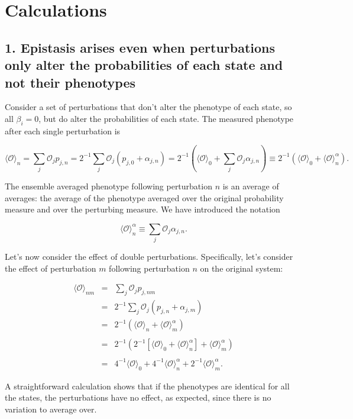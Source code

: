 \documentclass[12pt]{article}
\def\be{\begin{equation}}
\def\ee{\end{equation}}
\def\bea{\begin{eqnarray}}
\def\eea{\end{eqnarray}}
\def\O{\mathcal{O}}
\begin{document}
\section*{Calculations}

\subsection*{1. Epistasis arises even when perturbations only alter the probabilities of each state and not their phenotypes}

Consider a set of perturbations that don't alter the phenotype of each state, so all $\beta_i=0$, but do alter the probabilities of each state.  The measured phenotype after each single perturbation is

\be
\langle \O \rangle_n = \sum_j \O_jp_{j,n} = 2^{-1}\sum_j \O_j (p_{j,0} + \alpha_{j,n}) = 2^{-1}\left(\langle \O \rangle_0 + \sum_j \O_j \alpha_{j,n}\right) \equiv 2^{-1}(\langle \O \rangle_0 + \langle \O \rangle^{\alpha}_n).
\ee

\noindent The ensemble averaged phenotype following perturbation $n$ is an average of averages: the average of the phenotype averaged over the original probability measure and over the perturbing measure.  We have introduced the notation

\be
 \langle \O \rangle^{\alpha}_n  \equiv \sum_j \O_j \alpha_{j,n}.
\ee

Let's now consider the effect of double perturbations.  Specifically, let's consider the effect of perturbation $m$ following perturbation $n$ on the original system:

\bea
\langle \O \rangle_{nm} &=& \sum_j \O_jp_{j,nm} \nonumber\\
&=& 2^{-1}\sum_j \O_j (p_{j,n} + \alpha_{j,m}) \nonumber\\
&=& 2^{-1}(\langle \O \rangle_n + \langle \O \rangle_m^{\alpha}) \nonumber\\
&&\nonumber\\
&=& 2^{-1}(2^{-1}[\langle \O \rangle_0 + \langle \O \rangle_n^{\alpha}] +  \langle \O \rangle_m^{\alpha})\nonumber\\
&&\nonumber\\
&=& 4^{-1}\langle \O \rangle_0 + 4^{-1} \langle \O \rangle_n^{\alpha} + 2^{-1} \langle \O \rangle_m^{\alpha}.
\eea

\noindent A straightforward calculation shows that if the phenotypes are identical for all the states, the perturbations have no effect, as expected, since there is no variation to average over.  %
\end{document}

